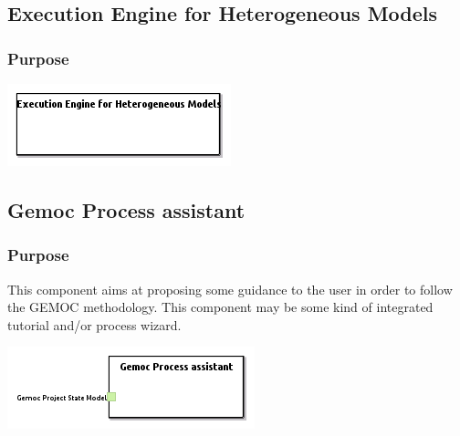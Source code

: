 \documentclass{gemoc} %
\begin{document}
\subsection{Execution Engine for Heterogeneous Models}
\label{sec:Execution_Engine_for_Heterogeneous_Models}


\subsubsection{Purpose}


\begin{center}
\includegraphics*[trim=0.0cm 0.0cm 0cm 0.0cm, clip=true]{../images/generated/Generated_Execution_Engine_for_Heterogeneous_Models.png}
\end{center}




\subsection{Gemoc Process assistant}
\label{sec:Gemoc_Process_assistant}


\subsubsection{Purpose}
This component aims at proposing some guidance to the user in order to follow the GEMOC methodology. This component may be some kind of integrated tutorial and/or process wizard.

\begin{center}
\includegraphics*[trim=0.0cm 0.0cm 0cm 0.0cm, clip=true]{../images/generated/Generated_Gemoc_Process_assistant.png}
\end{center}
\end{document}
